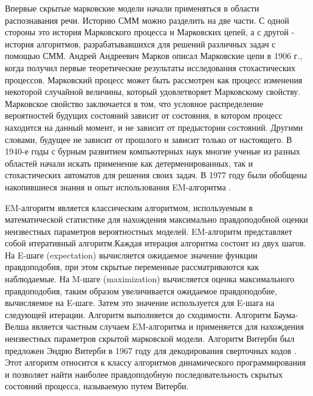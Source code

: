 Впервые скрытые марковские модели начали применяться в области распознавания речи. Историю СММ можно разделить на две части. \cite{kouemou} С одной стороны это история Марковского процесса и Марковских цепей, а с другой - история алгоритмов, разрабатывавшихся для решений различных задач с помощью СММ. Андрей Андреевич Марков описал Марковские цепи в 1906 г., когда получил первые теоретические результаты исследования стохастических процессов. Марковский процесс может быть рассмотрен как процесс изменения некоторой случайной величины, который удовлетворяет Марковскому свойству. Марковское свойство заключается в том, что условное распределение вероятностей будущих состояний зависит от состояния, в котором процесс находится на данный момент, и не зависит от предыстории состояний. Другими словами, будущее не зависит от прошлого и зависит только от настоящего. В 1940-е годы с бурным развитием компьютерных наук многие ученые из разных областей начали искать применение как детерменированных, так и стохастических автоматов для решения своих задач. В 1977 году были обобщены накопившиеся знания и опыт использования EM-алгоритма \cite{dempster1977maximum}. 

EM-алгоритм является классическим алгоритмом, используемым в математической статистике для нахождения максимально правдоподобной оценки неизвестных параметров вероятностных моделей. EM-алгоритм представляет собой итеративный алгоритм.Каждая итерация алгоритма состоит из двух шагов. На E-шаге (expectation) вычисляется ожидаемое значение функции правдоподобия, при этом скрытые переменные рассматриваются как наблюдаемые. На M-шаге (maximization) вычисляется оценка максимального правдоподобия, таким образом увеличивается ожидаемое правдоподобие, вычисляемое на E-шаге. Затем это значение используется для E-шага на следующей итерации. Алгоритм выполняется до сходимости. Алгоритм Баума-Велша является частным случаем EM-алгоритма и применяется для нахождения неизвестных параметров скрытой марковской модели. Алгоритм Витерби был предложен Эндрю Витерби в 1967 году для декодирования сверточных кодов \cite{viterbi1967error}. Этот алгоритм относится к классу алгоритмов динамического программирования и позволяет найти наиболее правдоподобную последовательность скрытых состояний процесса, называемую путем Витерби.

